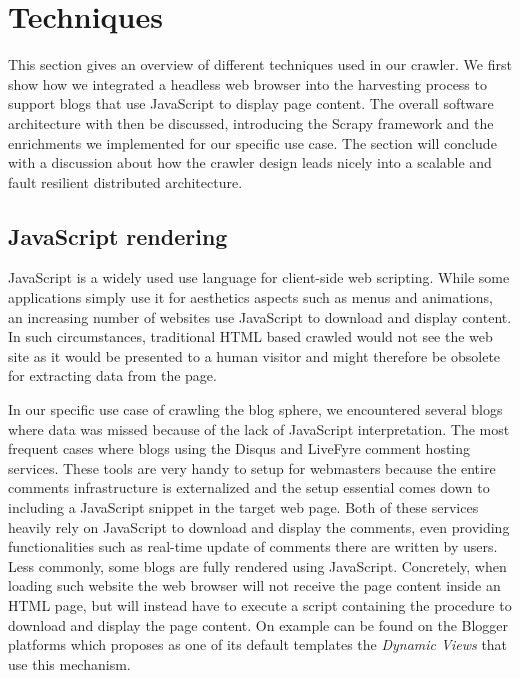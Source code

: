 \section{Techniques}

This section gives an overview of different techniques used in our crawler. We first show how we integrated a headless web browser into the harvesting process to support blogs that use JavaScript to display page content. The overall software architecture with then be discussed, introducing the Scrapy framework and the enrichments we implemented for our specific use case. The section will conclude with a discussion about how the crawler design leads nicely into a scalable and fault resilient distributed architecture.


\subsection{JavaScript rendering}
JavaScript is a widely used use language for client-side web scripting. While some applications simply use it for aesthetics aspects such as menus and animations, an increasing number of websites use JavaScript to download and display content. In such circumstances, traditional HTML based crawled would not see the web site as it would be presented to a human visitor and might therefore be obsolete for extracting data from the page.

In our specific use case of crawling the blog sphere, we encountered several blogs where data was missed because of the lack of JavaScript interpretation. The most frequent cases where blogs using the Disqus\cite{disqus2013} and LiveFyre\cite{livefyre2013} comment hosting services. These tools are very handy to setup for webmasters because the entire comments infrastructure is externalized and the setup essential comes down to including a JavaScript snippet in the target web page. Both of these services heavily rely on JavaScript to download and display the comments, even providing functionalities such as real-time update of comments there are written by users. Less commonly, some blogs are fully rendered using JavaScript. Concretely, when loading such website the web browser will not receive the page content inside an HTML page, but will instead have to execute a script containing the procedure to download and display the page content. On example can be found on the Blogger platforms which proposes as one of its default templates the \emph{Dynamic Views} \cite{antinharasymiv2011} that use this mechanism.

